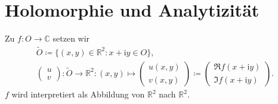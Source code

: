 %

\section{Holomorphie und Analytizität}
\addtocounter{thmn}{1}
\setcounter{theorem}{0}


\begin{theorem}[Vereinbarung]
  Zu $f : O \to \mathbb{C}$ setzen wir
  \begin{gather*}
    \widetilde{O} \coloneq \{ (x,y) \in \mathbb{R}^2 : x + \mathrm{i} y \in O \} , \\
    \begin{pmatrix} u \\ v \end{pmatrix} : \widetilde{O} \to \mathbb{R}^2 : (x,y) \mapsto \begin{pmatrix} u(x,y) \\ v(x,y) \end{pmatrix} \coloneq \begin{pmatrix} \Re f(x + \mathrm{i} y) \\ \Im f(x + \mathrm{i} y) \end{pmatrix}.
  \end{gather*}
  $f$ wird interpretiert als Abbildung von $\mathbb{R}^2$ nach $\mathbb{R}^2$.
\end{theorem}


